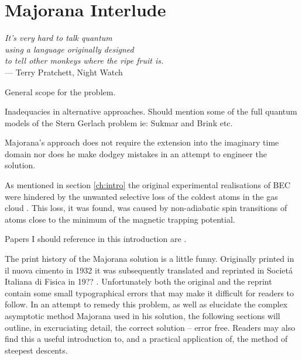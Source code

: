 
\chapter{Majorana Interlude} %

\label{ch:majinter} %


\begin{flushright}{\slshape    
It's very hard to talk quantum\\
using a language originally designed\\
to tell other monkeys where the ripe fruit is.} \\ \medskip
--- Terry Pratchett, Night Watch
\end{flushright}

\bigskip


General scope for the problem.

Inadequacies in alternative approaches. Should mention some of the full quantum models of the Stern Gerlach problem ie: Sukmar and Brink etc.

Majorana's approach does not require the extension into the imaginary time domain nor does he make dodgey mistakes in an attempt to engineer the solution.

As mentioned in section \autoref{ch:intro} the original experimental realisations of BEC were hindered by the unwanted selective loss of the coldest atoms in the gas cloud \cite{Cornell2002, Ketterle2002}.
This loss, it was found, was caused by non-adiabatic spin transitions of atoms close to the minimum of the magnetic trapping potential.

Papers I should reference in this introduction are \cite{Bloch1945,Giacomo2005,Wittig2005,Ma2006, Vutha2010}.

The print history of the Majorana solution is a little funny.
Originally printed in il nuova cimento in 1932 \cite{Majorana1932-orig} it was subsequently translated and reprinted in Societ\'a Italiana di Fisica in 19?? \cite{?}.
Unfortunately both the original and the reprint contain some small typographical errors that may make it difficult for readers to follow.
In an attempt to remedy this problem, as well as elucidate the complex asymptotic method Majorana used in his solution, the following sections will outline, in excruciating detail, the correct solution -- error free.
Readers may also find this a useful introduction to, and a practical application of, the method of steepest descents.

